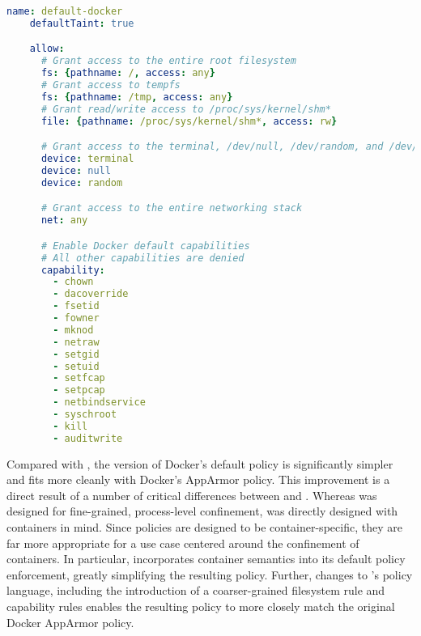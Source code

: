 \begin{lstlisting}[language=yaml, gobble=4,
  caption={[Implementing the default Docker policy in \bpfcontain{}]
    Implementing the default Docker policy in \bpfcontain{}.
    %A few coarse-grained
    %allow-rules can be used to capture permissive Docker defaults that are not covered
    %under \bpfcontain{}'s default policy. Other aspects of the Docker defaults are already
    %covered under \bpfcontain{} defaults, such as the inability to mount filesystems,
    %perform a number of privileged system calls, and interact with non-pid entries in
    %procfs and sysfs. Due to \bpfcontain{}'s default policy for file access and \gls{ipc},
    %it is neither necessary to specify file access rules for files within the container's
    %overlay filesystem not \gls{ipc} rules for processes within the container.
  },
  label={lst:bpfcontain-docker-default}]
    name: default-docker
    defaultTaint: true

    allow:
      # Grant access to the entire root filesystem
      fs: {pathname: /, access: any}
      # Grant access to tempfs
      fs: {pathname: /tmp, access: any}
      # Grant read/write access to /proc/sys/kernel/shm*
      file: {pathname: /proc/sys/kernel/shm*, access: rw}

      # Grant access to the terminal, /dev/null, /dev/random, and /dev/urandom
      device: terminal
      device: null
      device: random

      # Grant access to the entire networking stack
      net: any

      # Enable Docker default capabilities
      # All other capabilities are denied
      capability:
        - chown
        - dacoverride
        - fsetid
        - fowner
        - mknod
        - netraw
        - setgid
        - setuid
        - setfcap
        - setpcap
        - netbindservice
        - syschroot
        - kill
        - auditwrite
\end{lstlisting}

Compared with \bpfbox{}, the \bpfcontain{} version of Docker's default policy is
significantly simpler and fits more cleanly with Docker's AppArmor policy. This
improvement is a direct result of a number of critical differences between \bpfbox{} and
\bpfcontain{}. Whereas \bpfbox{} was designed for fine-grained, process-level confinement,
\bpfcontain{} was directly designed with containers in mind. Since \bpfcontain{} policies
are designed to be container-specific, they are far more appropriate for a use case
centered around the confinement of containers. In particular, \bpfcontain{} incorporates
container semantics into its default policy enforcement, greatly simplifying the resulting
policy.  Further, changes to \bpfcontain{}'s policy language, including the introduction
of a coarser-grained filesystem rule and capability rules enables the resulting policy to
more closely match the original Docker AppArmor policy.

